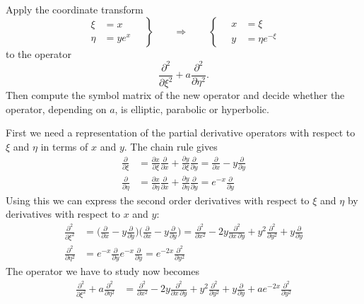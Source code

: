 Apply the coordinate transform
\[
\left.
\begin{aligned}
\xi  &= x    \\
\eta &= ye^x 
\end{aligned}
\quad
\right\}
\qquad\Rightarrow\qquad
\left\{
\quad
\begin{aligned}
 x &= \xi\\
 y &= \eta e^{-\xi}
\end{aligned}
\right.
\]
to the operator
\[
\frac{\partial^2}{\partial \xi^2}+a\frac{\partial^2}{\partial \eta^2}.
\]
Then compute the symbol matrix of the new operator and decide
whether the operator, depending on $a$, is elliptic, parabolic or
hyperbolic.

\begin{loesung}
First we need a representation of the partial derivative operators
with respect to $\xi$ and $\eta$ in terms of $x$ and $y$.
The chain rule gives
\begin{align*}
\frac{\partial}{\partial \xi}
&=
\frac{\partial x}{\partial \xi}\frac{\partial}{\partial x}
+
\frac{\partial y}{\partial \xi}\frac{\partial}{\partial y}
=
\frac{\partial}{\partial x}
-
y\frac{\partial}{\partial y}
\\
\frac{\partial}{\partial \eta}
&=
\frac{\partial x}{\partial \eta}\frac{\partial}{\partial x}
+
\frac{\partial y}{\partial \eta}\frac{\partial}{\partial y}
=
e^{-x} \frac{\partial}{\partial y}
\end{align*}
Using this we can express the second order derivatives with respect
to $\xi$ and $\eta$ by derivatives with respect to $x$ and $y$:
\begin{align*}
\frac{\partial^2}{\partial\xi^2}
&=
\biggl(\frac{\partial}{\partial x}-y\frac{\partial}{\partial y}\biggr)
\biggl(\frac{\partial}{\partial x}-y\frac{\partial}{\partial y}\biggr)
=
\frac{\partial^2}{\partial x^2} - 2y\frac{\partial^2}{\partial x\,\partial y}
+y^2\frac{\partial^2}{\partial y^2}+y\frac{\partial}{\partial y}
\\
\frac{\partial^2}{\partial\eta^2}
&=
e^{-x}\frac{\partial}{\partial y}e^{-x}\frac{\partial}{\partial y}
=
e^{-2x}\frac{\partial^2}{\partial y^2}
\end{align*}
The operator we have to study now becomes
\begin{align*}
\frac{\partial^2}{\partial\xi^2}
+a
\frac{\partial^2}{\partial\eta^2}
&=
\frac{\partial^2}{\partial x^2} - 2y\frac{\partial^2}{\partial x\,\partial y}
+y^2\frac{\partial^2}{\partial y^2}+y\frac{\partial}{\partial y}
+ae^{-2x}\frac{\partial^2}{\partial y^2}

\end{align*}
\end{loesung}
